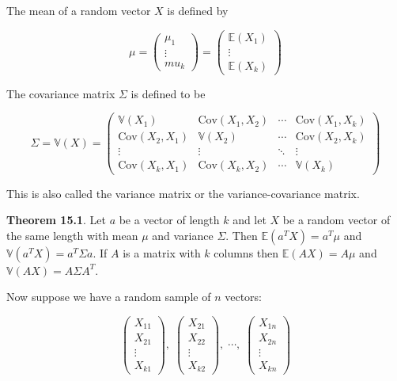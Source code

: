 The mean of a random vector \(X\) is defined by

\[\mu 
= \begin{pmatrix} \mu_1 \\ \vdots \\ mu_k \end{pmatrix} 
= \begin{pmatrix} \mathbb{E}(X_1) \\ \vdots \\ \mathbb{E}(X_k) \end{pmatrix}
\]

The covariance matrix \(\Sigma\) is defined to be

\[\Sigma = \mathbb{V}(X) = \begin{pmatrix}
\mathbb{V}(X_1) & \text{Cov}(X_1, X_2) & \cdots & \text{Cov}(X_1, X_k) \\
\text{Cov}(X_2, X_1) & \mathbb{V}(X_2) & \cdots & \text{Cov}(X_2, X_k) \\
\vdots & \vdots & \ddots & \vdots \\
\text{Cov}(X_k, X_1) & \text{Cov}(X_k, X_2) & \cdots & \mathbb{V}(X_k)
\end{pmatrix}\]

This is also called the variance matrix or the variance-covariance
matrix.

\textbf{Theorem 15.1}. Let \(a\) be a vector of length \(k\) and let
\(X\) be a random vector of the same length with mean \(\mu\) and
variance \(\Sigma\). Then \(\mathbb{E}(a^T X) = a^T\mu\) and
\(\mathbb{V}(a^T X) = a^T \Sigma a\). If \(A\) is a matrix with \(k\)
columns then \(\mathbb{E}(AX) = A\mu\) and
\(\mathbb{V}(AX) = A \Sigma A^T\).

Now suppose we have a random sample of \(n\) vectors:

\[
\begin{pmatrix}X_{11} \\ X_{21} \\ \vdots \\ X_{k1} \end{pmatrix}, \;
\begin{pmatrix}X_{21} \\ X_{22} \\ \vdots \\ X_{k2} \end{pmatrix}, \;
\cdots , \;
\begin{pmatrix}X_{1n} \\ X_{2n} \\ \vdots \\ X_{kn} \end{pmatrix}
\]

